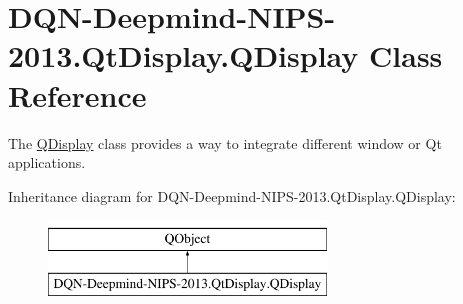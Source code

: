 \hypertarget{classDQN-Deepmind-NIPS-2013_1_1QtDisplay_1_1QDisplay}{}\section{D\+Q\+N-\/\+Deepmind-\/\+N\+I\+P\+S-\/2013.Qt\+Display.\+Q\+Display Class Reference}
\label{classDQN-Deepmind-NIPS-2013_1_1QtDisplay_1_1QDisplay}


The \hyperlink{classDQN-Deepmind-NIPS-2013_1_1QtDisplay_1_1QDisplay}{Q\+Display} class provides a way to integrate different window or Qt applications.  


Inheritance diagram for D\+Q\+N-\/\+Deepmind-\/\+N\+I\+P\+S-\/2013.Qt\+Display.\+Q\+Display\+:\begin{figure}[H]
\begin{center}
\leavevmode
\includegraphics[height=2.000000cm]{classDQN-Deepmind-NIPS-2013_1_1QtDisplay_1_1QDisplay}
\end{center}
\end{figure}

